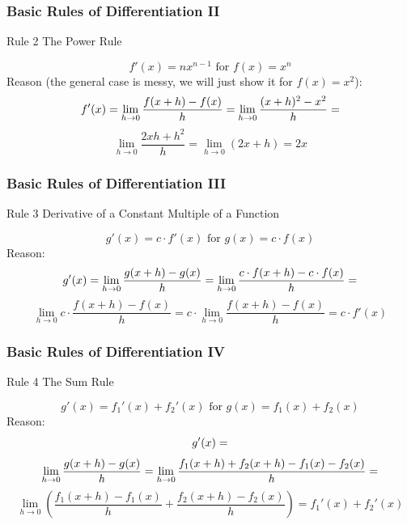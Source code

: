 \documentclass[xcolor=dvipsnames]{beamer}
\begin{document}
\begin{frame}
  \frametitle{Basic Rules of Differentiation II}
  \begin{block}{Rule 2}
The Power Rule
  \end{block}
\begin{equation}
  \label{eq:oomaenee}
f'(x)=nx^{n-1}\mbox{ for }f(x)=x^{n}
\end{equation}
Reason (the general case is messy, we will just show it for $f(x)=x^{2}$):
\begin{equation}
  \label{eq:eeyeejeu}
f'(x)=\lim_{h\rightarrow{}0}\frac{f(x+h)-f(x)}{h}=\lim_{h\rightarrow{}0}\frac{(x+h)^{2}-x^{2}}{h}=\notag
\end{equation}
\begin{equation}
  \label{eq:wuuxaise}
\lim_{h\rightarrow{}0}\frac{2xh+h^{2}}{h}=\lim_{h\rightarrow{}0}(2x+h)=2x
\end{equation}
\end{frame}

\begin{frame}
  \frametitle{Basic Rules of Differentiation III}
  \begin{block}{Rule 3}
Derivative of a Constant Multiple of a Function
  \end{block}
\begin{equation}
  \label{eq:thahchae}
g'(x)=c\cdot{}f'(x)\mbox{ for }g(x)=c\cdot{}f(x)
\end{equation}
Reason:
\begin{equation}
  \label{eq:quaipahn}
g'(x)=\lim_{h\rightarrow{}0}\frac{g(x+h)-g(x)}{h}=\lim_{h\rightarrow{}0}\frac{c\cdot{}f(x+h)-c\cdot{}f(x)}{h}=\notag
\end{equation}
\begin{equation}
  \label{eq:mitahrei}
\lim_{h\rightarrow{}0}c\cdot{}\frac{f(x+h)-f(x)}{h}=c\cdot\lim_{h\rightarrow{}0}\frac{f(x+h)-f(x)}{h}=c\cdot{}f'(x)
\end{equation}
\end{frame}

\begin{frame}
  \frametitle{Basic Rules of Differentiation IV}
  \begin{block}{Rule 4}
The Sum Rule
  \end{block}
\begin{equation}
  \label{eq:oubajaez}
g'(x)=f_{1}'(x)+f_{2}'(x)\mbox{ for }g(x)=f_{1}(x)+f_{2}(x)
\end{equation}
Reason:
\begin{equation}
  \label{eq:heyanaci}
g'(x)=\notag
\end{equation}
\begin{equation}
  \label{eq:bahgosio}
\lim_{h\rightarrow{}0}\frac{g(x+h)-g(x)}{h}=\lim_{h\rightarrow{}0}\frac{f_{1}(x+h)+f_{2}(x+h)-f_{1}(x)-f_{2}(x)}{h}=\notag
\end{equation}
\begin{equation}
  \label{eq:eceishie}
\lim_{h\rightarrow{}0}\left(\frac{f_{1}(x+h)-f_{1}(x)}{h}+\frac{f_{2}(x+h)-f_{2}(x)}{h}\right)=f_{1}'(x)+f_{2}'(x)
\end{equation}
\end{frame}
\end{document}
